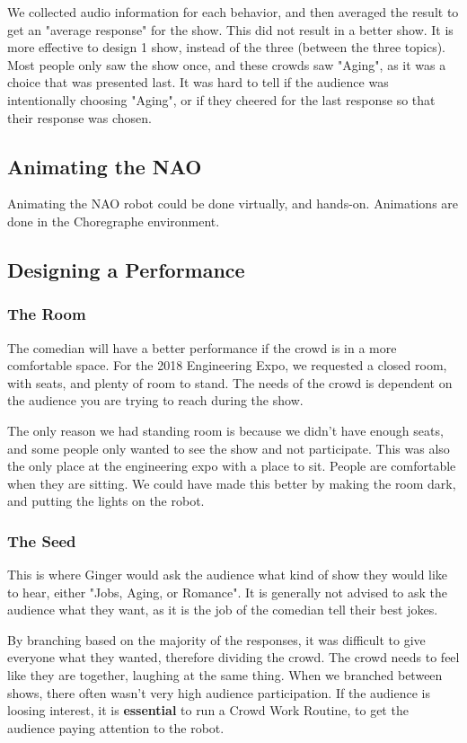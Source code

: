         We collected audio information for each behavior, and then averaged the result to get an "average response" for the show.
        This did not result in a better show. It is more effective to design 1 show, instead of the three (between the three topics).
        Most people only saw the show once, and these crowds saw "Aging", as it was a choice that was presented last.
        It was hard to tell if the audience was intentionally choosing "Aging", or if they cheered for the last response so that their response was chosen.

\subsection{Animating the NAO}
Animating the NAO robot could be done virtually, and hands-on.
Animations are done in the Choregraphe environment. 


\subsection{Designing a Performance}

    \subsubsection{The Room}
    The comedian will have a better performance if the crowd is in a more comfortable space.
    For the 2018 Engineering Expo, we requested a closed room, with seats, and plenty of room to stand.
    The needs of the crowd is dependent on the audience you are trying to reach during the show.


    The only reason we had standing room is because we didn't have enough seats, and some people only wanted to see the show and not participate.
    This was also the only place at the engineering expo with a place to sit.
    People are comfortable when they are sitting.
    We could have made this better by making the room dark, and putting the lights on the robot.
    \subsubsection{The Seed}
    This is where Ginger would ask the audience what kind of show they would like to hear, either "Jobs, Aging, or Romance".
    It is generally not advised to ask the audience what they want, as it is the job of the comedian tell their best jokes.


    By branching based on the majority of the responses, it was difficult to give everyone what they wanted, therefore dividing the crowd.
    The crowd needs to feel like they are together, laughing at the same thing.
    When we branched between shows, there often wasn't very high audience participation.
    If the audience is loosing interest, it is \textbf{essential} to run a Crowd Work Routine, to get the audience paying attention to the robot.
